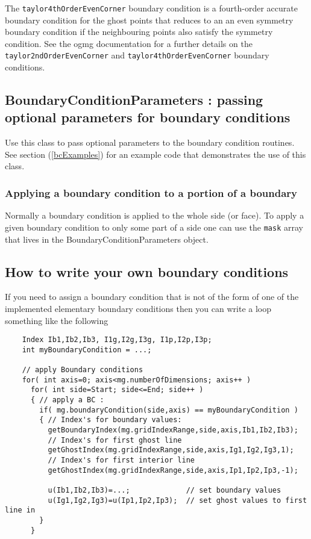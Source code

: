The {\tt taylor4thOrderEvenCorner} boundary condition is a fourth-order accurate boundary condition
for the ghost points that reduces to an an even symmetry boundary condition
if the neighbouring points also satisfy the symmetry condition.
See the ogmg documentation for a further details on the {\tt taylor2ndOrderEvenCorner}
and {\tt taylor4thOrderEvenCorner} boundary conditions.

\subsection{BoundaryConditionParameters : passing optional parameters for boundary conditions}

Use this class to pass optional parameters to the boundary condition
routines. See section (\ref{bcExamples}) for an example code that demonstrates the use
of this class.

\subsubsection{Applying a boundary condition to a portion of a boundary}

  Normally a boundary condition is applied to the whole side (or face). To apply a given 
boundary condition to only some part of a side one can use the {\tt mask} array that
lives in the BoundaryConditionParameters object. 




\subsection{How to write your own boundary conditions}

If you need to assign a boundary condition that is not of
the form of one of the implemented elementary boundary conditions
then you can write a loop something like the following

{\footnotesize
\begin{verbatim}
    Index Ib1,Ib2,Ib3, I1g,I2g,I3g, I1p,I2p,I3p;
    int myBoundaryCondition = ...;

    // apply Boundary conditions
    for( int axis=0; axis<mg.numberOfDimensions; axis++ )
      for( int side=Start; side<=End; side++ )
      { // apply a BC :
        if( mg.boundaryCondition(side,axis) == myBoundaryCondition )
        { // Index's for boundary values:
          getBoundaryIndex(mg.gridIndexRange,side,axis,Ib1,Ib2,Ib3);
          // Index's for first ghost line
          getGhostIndex(mg.gridIndexRange,side,axis,Ig1,Ig2,Ig3,1);
          // Index's for first interior line
          getGhostIndex(mg.gridIndexRange,side,axis,Ip1,Ip2,Ip3,-1);

          u(Ib1,Ib2,Ib3)=...;             // set boundary values
          u(Ig1,Ig2,Ig3)=u(Ip1,Ip2,Ip3);  // set ghost values to first line in
        }
      }
\end{verbatim}
}